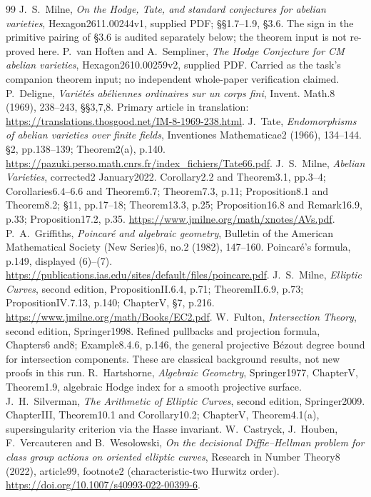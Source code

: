 \begin{thebibliography}{99}
 J.~S.~Milne, \emph{On the Hodge, Tate, and standard conjectures for abelian varieties}, Hexagon2611.00244v1, supplied PDF; \S\S1.7--1.9, \S3.6. The sign in the primitive pairing of \S3.6 is audited separately below; the theorem input is not re-proved here.
 P.~van Hoften and A.~Sempliner, \emph{The Hodge Conjecture for CM abelian varieties}, Hexagon2610.00259v2, supplied PDF. Carried as the task's companion theorem input; no independent whole-paper verification claimed.
 P.~Deligne, \emph{Vari\'et\'es ab\'eliennes ordinaires sur un corps fini}, Invent. Math.8 (1969), 238--243, \S\S3,7,8. Primary article in translation: \url{https://translations.thosgood.net/IM-8-1969-238.html}.
 J.~Tate, \emph{Endomorphisms of abelian varieties over finite fields}, Inventiones Mathematicae2 (1966), 134--144. \S2, pp.138--139; Theorem2(a), p.140. \url{https://pazuki.perso.math.cnrs.fr/index_fichiers/Tate66.pdf}.
 J.~S.~Milne, \emph{Abelian Varieties}, corrected2 January2022. Corollary2.2 and Theorem3.1, pp.3--4; Corollaries6.4--6.6 and Theorem6.7; Theorem7.3, p.11; Proposition8.1 and Theorem8.2; \S11, pp.17--18; Theorem13.3, p.25; Proposition16.8 and Remark16.9, p.33; Proposition17.2, p.35. \url{https://www.jmilne.org/math/xnotes/AVs.pdf}.
 P.~A.~Griffiths, \emph{Poincar\'e and algebraic geometry}, Bulletin of the American Mathematical Society (New Series)6, no.2 (1982), 147--160. Poincar\'e's formula, p.149, displayed (6)--(7). \url{https://publications.ias.edu/sites/default/files/poincare.pdf}.
 J.~S.~Milne, \emph{Elliptic Curves}, second edition, PropositionII.6.4, p.71; TheoremII.6.9, p.73; PropositionIV.7.13, p.140; ChapterV, \S7, p.216. \url{https://www.jmilne.org/math/Books/EC2.pdf}.
 W.~Fulton, \emph{Intersection Theory}, second edition, Springer1998. Refined pullbacks and projection formula, Chapters6 and8; Example8.4.6, p.146, the general projective B\'ezout degree bound for intersection components. These are classical background results, not new proofs in this run.
 R.~Hartshorne, \emph{Algebraic Geometry}, Springer1977, ChapterV, Theorem1.9, algebraic Hodge index for a smooth projective surface.
 J.~H.~Silverman, \emph{The Arithmetic of Elliptic Curves}, second edition, Springer2009. ChapterIII, Theorem10.1 and Corollary10.2; ChapterV, Theorem4.1(a), supersingularity criterion via the Hasse invariant.
 W.~Castryck, J.~Houben, F.~Vercauteren and B.~Wesolowski, \emph{On the decisional Diffie--Hellman problem for class group actions on oriented elliptic curves}, Research in Number Theory8 (2022), article99, footnote2 (characteristic-two Hurwitz order). \url{https://doi.org/10.1007/s40993-022-00399-6}.

\end{thebibliography}
